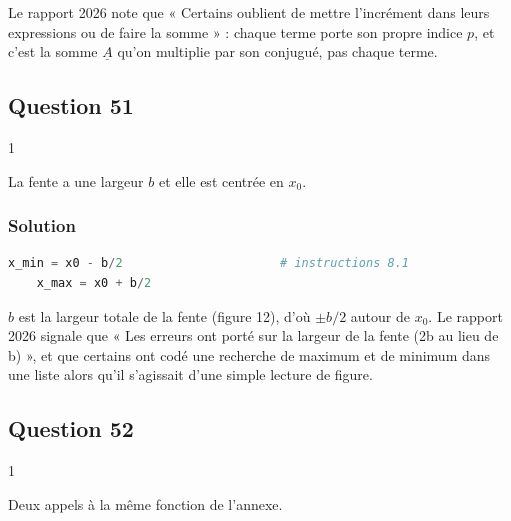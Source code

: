 \documentclass[11pt,a4paper]{article}
\begin{document}
\begin{piege}

Le rapport 2026 note que « Certains oublient de mettre l'incrément dans leurs expressions ou de faire la somme » : chaque terme porte son propre indice \(p\), et c'est la somme \(\underline A\) qu'on multiplie par son conjugué, pas chaque terme.

\end{piege}

\hypertarget{question-51}{%
\subsection{Question 51}\label{question-51}}

\begin{indication}{1}

La fente a une largeur \(b\) et elle est centrée en \(x_0\).

\end{indication}

\hypertarget{solution-50}{%
\subsubsection{Solution}\label{solution-50}}

\begin{lstlisting}[language=Python]
    x_min = x0 - b/2                      # instructions 8.1
    x_max = x0 + b/2
\end{lstlisting}

\begin{piege}

\(b\) est la largeur totale de la fente (figure 12), d'où \(\pm b/2\) autour de \(x_0\). Le rapport 2026 signale que « Les erreurs ont porté sur la largeur de la fente (2b au lieu de b) », et que certains ont codé une recherche de maximum et de minimum dans une liste alors qu'il s'agissait d'une simple lecture de figure.

\end{piege}

\hypertarget{question-52}{%
\subsection{Question 52}\label{question-52}}

\begin{indication}{1}

Deux appels à la même fonction de l'annexe.

\end{indication}
\end{document}
